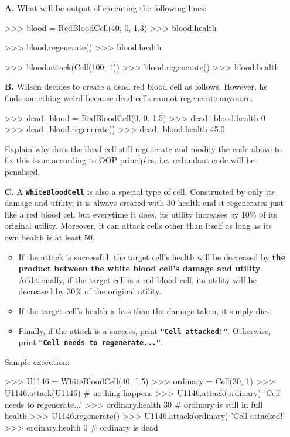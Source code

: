\begin{enumerate}
\item[\textbf{A.}]
What will be output of executing the following lines:
\begin{python}
>>> blood = RedBloodCell(40, 0, 1.3)
>>> blood.health

>>> blood.regenerate()
>>> blood.health

>>> blood.attack(Cell(100, 1))
>>> blood.regenerate()
>>> blood.health
\end{python}
\begin{flushright}
    [2 marks]
\end{flushright}

\item[\textbf{B.}]
Wilson decides to create a dead red blood cell as follows. However, he finds something weird because dead cells cannot regenerate anymore.
\begin{python}
>>> dead_blood = RedBloodCell(0, 0, 1.5)
>>> dead_blood.health
0
>>> dead_blood.regenerate()
>>> dead_blood.health
45.0
\end{python}
Explain why does the dead cell still regenerate and modify the code above to fix this issue according to OOP principles, i.e. 
redundant code will be penalised.
\begin{flushright}
    [4 marks]
\end{flushright}

\item[\textbf{C.}]
A \colorbox{CornflowerBlue!20}{\texttt{\textbf{WhiteBloodCell}}} is also a special type of cell. Constructed by only its damage and utility, it is always created 
with 30 health and it regenerates just like a red blood cell but everytime it does, its utility increases by 10\% of its original utility. Moreover, it can attack 
cells other than itself as long as its own health is at least 50.
\begin{itemize}
\item If the attack is successful, the target cell's health will be decreased by \textbf{the product between the white blood cell's damage and utility}. Additionally, 
if the target cell is a red blood cell, its utility will be decreased by 30\% of the original utility.
\item If the target cell's health is less than the damage taken, it simply dies.
\item Finally, if the attack is a success, print \texttt{\bfseries "Cell attacked!"}. Otherwise, print \texttt{\bfseries "Cell needs to regenerate..."}.
\end{itemize}
Sample execution:
\begin{python}
>>> U1146 = WhiteBloodCell(40, 1.5)
>>> ordinary = Cell(30, 1)
>>> U1146.attack(U1146)     # nothing happens
>>> U1146.attack(ordinary)
'Cell needs to regenerate...'
>>> ordinary.health
30                          # ordinary is still in full health
>>> U1146.regenerate()
>>> U1146.attack(ordinary)
'Cell attacked!'
>>> ordinary.health
0                           # ordinary is dead


\end{python}
\end{enumerate}
